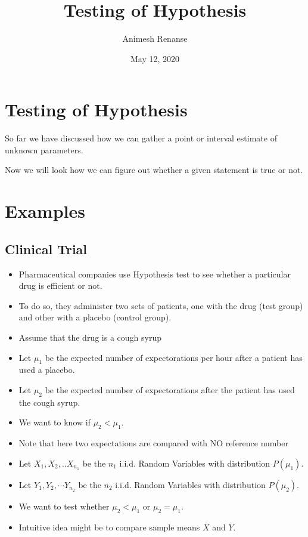 \documentclass[a4paper]{article}
\title{Testing of Hypothesis}
\author{Animesh Renanse}
\date{May 12, 2020}
\begin{document}
\maketitle
\newpage

\section{Testing of Hypothesis}
So far we have discussed how we can gather a point or interval estimate of unknown parameters.

Now we will look how we can figure out whether a given statement is true or not.

\section{Examples}
\subsection{Clinical Trial}
\begin{itemize}
	\item{Pharmaceutical companies use Hypothesis test to see whether a particular drug is efficient or not.}
	\item{To do so, they administer two sets of patients, one with the drug (test group) and other with a placebo (control group).}
	\item{Assume that the drug is a cough syrup}
	\item{Let $\mu_1$ be the expected number of expectorations per hour after a patient has used a placebo.}
	\item{Let $\mu_2$ be the expected number of expectorations after the patient has used the cough syrup.}
	\item{We want to know if $\mu_2 < \mu_1$.}
	\item{Note that here two expectations are compared with NO reference number}
	\item{Let $X_1, X_2, .. X_{n_1} $ be the $n_1$ i.i.d. Random Variables with distribution $P(\mu_1)$.}
	\item{Let $Y_1, Y_2, \cdots Y_{n_2}$ be the $n_2$ i.i.d. Random Variables with distribution $P(\mu_2)$. }
	\item{We want to test whether $\mu_2 < \mu_1$ or  $ \mu_2 = \mu_1$.}
	\item{Intuitive idea might be to compare sample means $\overline{X}$ and $\overline{ Y}$.}

\end{itemize}
\end{document}
